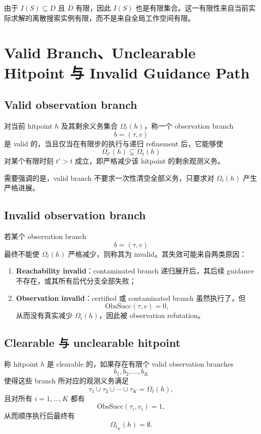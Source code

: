 \documentclass[11pt]{ctexart}
\begin{document}
由于 $I(S)\subseteq D$ 且 $D$ 有限，因此 $I(S)$ 也是有限集合。这一有限性来自当前实际求解的离散搜索实例有限，而不是来自全局工作空间有限。

\section{Valid Branch、Unclearable Hitpoint 与 Invalid Guidance Path}

\subsection{Valid observation branch}

对当前 hitpoint $h$ 及其剩余义务集合 $\Omega_t(h)$，称一个 observation branch
\[
b=(\tau,v)
\]
是 valid 的，当且仅当在有限步的执行与递归 refinement 后，它能够使
\[
\Omega_{t'}(h)\subsetneq \Omega_t(h)
\]
对某个有限时刻 $t'>t$ 成立，即严格减少该 hitpoint 的剩余观测义务。

需要强调的是，valid branch 不要求一次性清空全部义务，只要求对 $\Omega_t(h)$ 产生严格进展。

\subsection{Invalid observation branch}

若某个 observation branch
\[
b=(\tau,v)
\]
最终不能使 $\Omega_t(h)$ 严格减少，则称其为 invalid。其失效可能来自两类原因：
\begin{enumerate}[leftmargin=2em]
    \item \textbf{Reachability invalid}：contaminated branch 递归展开后，其后续 guidance 不存在，或其所有后代分支全部失败；
    \item \textbf{Observation invalid}：certified 或 contaminated branch 虽然执行了，但
    \[
    \mathrm{ObsSucc}(\tau,v)=0,
    \]
    从而没有真实减少 $\Omega_t(h)$，因此被 observation refutation。
\end{enumerate}

\subsection{Clearable 与 unclearable hitpoint}

称 hitpoint $h$ 是 clearable 的，如果存在有限个 valid observation branches
\[
b_1,b_2,\dots,b_K
\]
使得这些 branch 所对应的观测义务满足
\[
\tau_1\cup\tau_2\cup\cdots\cup\tau_K=\Omega_t(h),
\]
且对所有 $i=1,\dots,K$ 都有
\[
\mathrm{ObsSucc}(\tau_i,v_i)=1,
\]
从而顺序执行后最终有
\[
\Omega_{t_K}(h)=\emptyset.
\]
\end{document}
